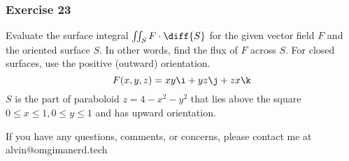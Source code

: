 \documentclass{math}
\begin{document}
\subsubsection*{Exercise 23}
Evaluate the surface integral \( \iint_{S}F\cdot\diff{S} \) for the given vector
field \( F \) and the oriented surface \( S \). In other words, find the flux of
\( F \) across \( S \). For closed surfaces, use the positive (outward)
orientation.
\[ F(x,y,z) = xy\i+yz\j+zx\k \]
\( S \) is the part of paraboloid \( z = 4-x^2-y^2 \) that lies above the square
\( 0\le x\le1,0\le y\le1 \) and has upward orientation.

\begin{center}
  If you have any questions, comments, or concerns, please contact me at
  alvin@omgimanerd.tech
\end{center}
\end{document}
